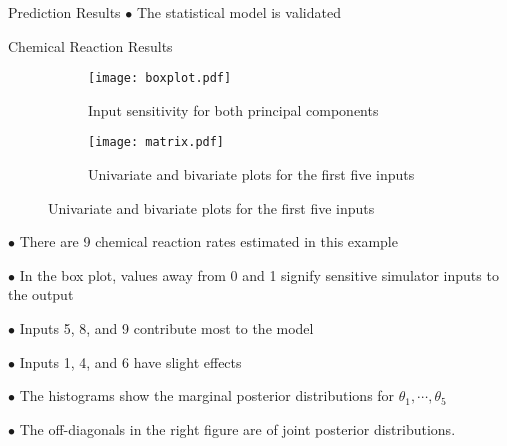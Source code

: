 \documentclass[final]{beamer}
\begin{document}
\begin{frame}{}
\begin{columns}[t]
\begin{column}{.28\linewidth}
\begin{block}{Prediction Results}
    $\bullet$ The statistical model is validated
    
    \end{block}

    \begin{block}{Chemical Reaction Results}

    \begin{figure}
        \begin{subfigure}{0.44\textwidth}
            \centering
            \texttt{[image: boxplot.pdf]}
            \caption*{Input sensitivity for both principal components}
        \end{subfigure}%
        \begin{subfigure}{0.49\textwidth}
            \centering
            \texttt{[image: matrix.pdf]}
            \caption*{Univariate and bivariate plots for the first five inputs}
        \end{subfigure}
    \end{figure}
    \bigskip
    \bigskip
    \bigskip
    \bigskip
    \bigskip
    \bigskip
    \bigskip
    \smallskip

    $\bullet$ There are 9 chemical reaction rates estimated in this example

    $\bullet$ In the box plot, values away from 0 and 1 signify sensitive simulator inputs to the output

    $\bullet$ Inputs 5, 8, and 9 contribute most to the model

    $\bullet$ Inputs 1, 4, and 6 have slight effects

    $\bullet$ The histograms show the marginal posterior distributions for $\theta_1,\cdots,\theta_5$

    $\bullet$ The off-diagonals in the right figure are of joint posterior distributions.

    \end{block}
\end{column}

\end{columns}
\end{frame}
\end{document}
